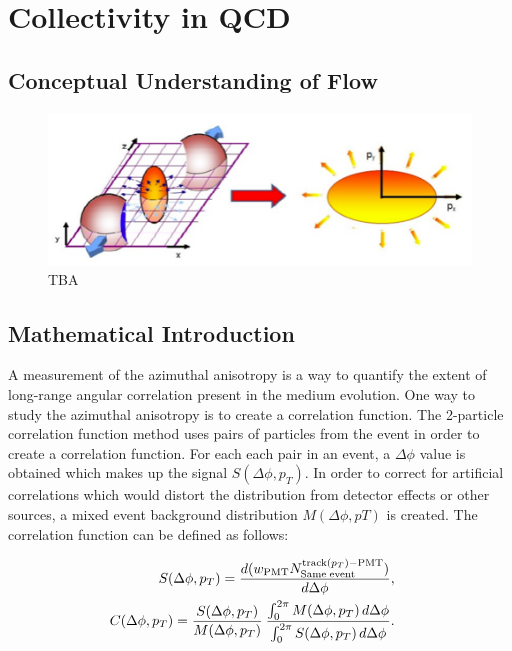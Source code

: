 \chapter{Collectivity in QCD}
\section{Conceptual Understanding of Flow}
\begin{figure}[h!]
\begin{center}
\includegraphics[width=0.45\linewidth]{figs/elliptical_flow_cartoon.png}
\caption{ TBA }
\end{center}
\end{figure}

\section{Mathematical Introduction}
A measurement of the azimuthal anisotropy is a way to quantify the extent of long-range angular correlation present in the medium evolution. One way to study the azimuthal anisotropy is to create a correlation function. The 2-particle correlation function method uses pairs of particles from the event in order to create a correlation function. For each each pair in an event, a $\Delta\phi$ value is obtained which makes up the signal $S(\Delta\phi,p_T)$. In order to correct for artificial correlations which would distort the distribution from detector effects or other sources, a mixed event background distribution $M(\Delta\phi,pT)$ is created. The correlation function can be defined as follows:


\begin{eqnarray}
  S(\Delta\phi,p_{T})=
  \frac{ d(w_{{\rm PMT}} N^{{\rm track}(p_{T}){\rm - PMT}}_{{\rm Same \; event}}) }{ d\Delta\phi}, & &
\label{eq31} \\
  C(\Delta\phi,p_{T}) =
          \frac{S(\Delta\phi,p_{T})}{M(\Delta\phi,p_{T})} \:
          \frac{\int_{0}^{2\pi} M(\Delta\phi,p_{T}) \, d\Delta\phi}{\int_{0}^{2\pi} S(\Delta\phi,p_{T}) \, d\Delta\phi}. & &
  \label{eq:def_corr_function}
\end{eqnarray}


